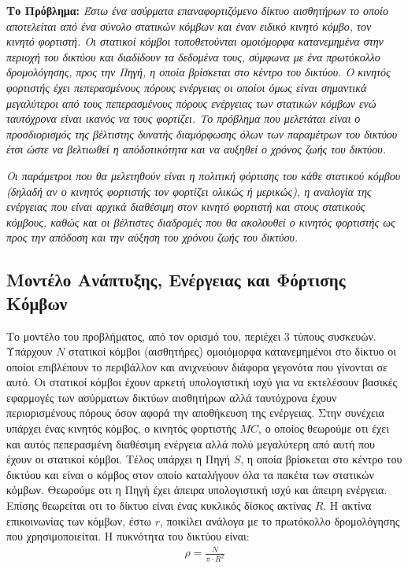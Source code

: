 \textbf{Το Πρόβλημα:} \textit{Έστω ένα ασύρματα επαναφορτιζόμενο δίκτυο αισθητήρων το οποίο αποτελείται από ένα σύνολο στατικών κόμβων και έναν ειδικό κινητό κόμβο,
τον κινητό φορτιστή. Οι στατικοί κόμβοι τοποθετούνται ομοιόμορφα κατανεμημένα στην περιοχή του δικτύου και διαδίδουν τα δεδομένα τους, σύμφωνα με ένα πρωτόκολλο
δρομολόγησης, προς την Πηγή, η οποία βρίσκεται στο κέντρο του δικτύου. Ο κινητός φορτιστής έχει πεπερασμένους πόρους ενέργειας οι οποίοι όμως είναι σημαντικά
μεγαλύτεροι από τους πεπερασμένους πόρους ενέργειας των στατικών κόμβων ενώ ταυτόχρονα είναι ικανός να τους φορτίζει. Το πρόβλημα που μελετάται είναι ο
προσδιορισμός της βέλτιστης δυνατής διαμόρφωσης όλων των παραμέτρων του δικτύου έτσι ώστε να βελτιωθεί η απόδοτικότητα και να αυξηθεί ο χρόνος ζωής του δικτύου.}

\textit{Οι παράμετροι που θα μελετηθούν είναι η πολιτική φόρτισης του κάθε στατικού κόμβου (δηλαδή αν ο κινητός φορτιστής τον φορτίζει ολικώς ή μερικώς), η αναλογία
της ενέργειας που είναι αρχικά διαθέσιμη στον κινητό φορτιστή και στους στατικούς κόμβους, καθώς και οι βέλτιστες διαδρομές που θα ακολουθεί ο κινητός φορτιστής ως
προς την απόδοση και την αύξηση του χρόνου ζωής του δικτύου.}



\subsection{Μοντέλο Ανάπτυξης, Ενέργειας και Φόρτισης Κόμβων}
Το μοντέλο του προβλήματος, από τον ορισμό του, περιέχει 3 τύπους συσκευών. Υπάρχουν $N$ στατικοί κόμβοι (αισθητήρες) ομοιόμορφα κατανεμημένοι στο δίκτυο οι
οποίοι επιβλέπουν το περιβάλλον και ανιχνεύουν διάφορα γεγονότα που γίνονται σε αυτό. Οι στατικοί κόμβοι έχουν αρκετή υπολογιστική ισχύ για να εκτελέσουν βασικές
εφαρμογές των ασύρματων δικτύων αισθητήρων αλλά ταυτόχρονα έχουν περιορισμένους πόρους όσον αφορά την αποθήκευση της ενέργειας. Στην συνέχεια υπάρχει ένας κινητός
κόμβος, ο κινητός φορτιστής $MC$, ο οποίος θεωρούμε οτι έχει και αυτός πεπερασμένη διαθέσιμη ενέργεια αλλά πολύ μεγαλύτερη από αυτή που έχουν οι στατικοί κόμβοι.
Τέλος υπάρχει η Πηγή $S$, η οποία βρίσκεται στο κέντρο του δικτύου και είναι ο κόμβος στον οποίο καταλήγουν όλα τα πακέτα των στατικών κόμβων. Θεωρούμε οτι η Πηγή
έχει άπειρα υπολογιστική ισχύ και άπειρη ενέργεια. Επίσης θεωρείται οτι το δίκτυο είναι ένας κυκλικός δίσκος ακτίνας $R$. Η ακτίνα επικοινωνίας των κόμβων, έστω $r$,
ποικίλει ανάλογα με το πρωτόκολλο δρομολόγησης που χρησιμοποιείται. Η πυκνότητα του δικτύου είναι:
\begin{align*}
\rho = \frac{N}{\pi\cdot R^{2}}
\end{align*}

